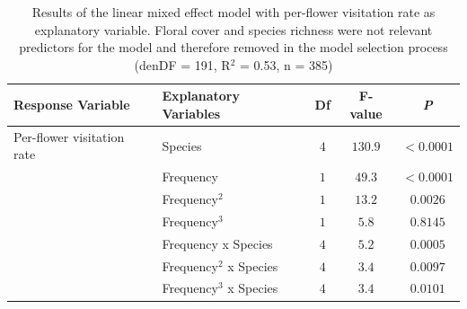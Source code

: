 \begin{table} [!htbp] %
	\centering
	\caption{Results of the linear mixed effect model with per-flower visitation rate as explanatory variable. Floral cover and species richness were not relevant predictors for the model and therefore removed in the model selection process (denDF = 191, R$^{2}$ = 0.53, n = 385)}
	\begin{tabular} { l l c c c}
		\toprule
		\textbf{Response Variable} & \textbf{Explanatory Variables} & \textbf{Df} & \textbf{F-value} & \textbf{\textit{P}} \\
		\midrule
		Per-flower visitation rate   & Species & $4$ & $130.9$ & $<0.0001$\\
		& Frequency 			&  $1$ & $49.3$ & $<0.0001$ \\
		& Frequency$^{2}$ 		&  $1$ & $13.2$ & $0.0026$ \\
		& Frequency$^{3}$ 		&  $1$ & $ 5.8$ &  $0.8145$ \\
		& Frequency x Species &  $4$ & $ 5.2$ &  $0.0005$ \\
		& Frequency$^{2}$ x Species & $4$ & $3.4$ & $0.0097$\\
		& Frequency$^{3}$ x Species & $4$ & $3.4$ & $0.0101$\\
		\bottomrule
	\end{tabular}
	\label{tab:anova}
\end{table}



